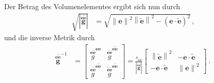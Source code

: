 \documentclass[a4paper,11pt]{scrartcl}
\newcommand{\g}{\mathbf{g}} %
\newcommand{\vect}[1]{\mathbf{#1}}
\newcommand{\flatgb}[2]{\overset{#1 #2}{\g}}
\newcommand{\flatg}[2]{\overset{#1 #2}{g}}
\newcommand{\formComma}{\,\text{,}}
\newcommand{\formPeriod}{\,\text{.}}
\begin{document}
      Der Betrag des Volumenelementes ergibt sich nun durch
      \begin{align}
        \sqrt{\left| \flatgb{\vect{e}}{\tilde{\vect{e}}} \right|}
            &= \sqrt{\left\| \vect{e} \right\|^{2}\left\| \tilde{\vect{e}} \right\|^{2} 
                        - \left( \vect{e}\cdot\tilde{\vect{e}}\right)^{2}} \formComma
      \end{align}
      und die inverse Metrik durch
      \begin{align}
        \flatgb{\vect{e}}{\tilde{\vect{e}}}^{-1}
            &=
                \begin{bmatrix}
                  \flatg{\vect{e}}{\tilde{\vect{e}}}^{\vect{e}\vect{e}} & \flatg{\vect{e}}{\tilde{\vect{e}}}^{\vect{e}\tilde{\vect{e}}} \\
                  \flatg{\vect{e}}{\tilde{\vect{e}}}^{\vect{e}\tilde{\vect{e}}} & \flatg{\tilde{\vect{e}}}{\tilde{\vect{e}}}^{\vect{e}\tilde{\vect{e}}}
                \end{bmatrix}
             = 
                \frac{s_{\vect{e}\tilde{\vect{e}}}}{\left| \flatgb{\vect{e}}{\tilde{\vect{e}}} \right|}
                  \begin{bmatrix}
                   \left\| \tilde{\vect{e}} \right\|^{2} & -\vect{e}\cdot\tilde{\vect{e}} \\
                    -\vect{e}\cdot\tilde{\vect{e}} & \left\| \vect{e} \right\|^{2}                   
                  \end{bmatrix} \formPeriod
      \end{align}
\end{document}
